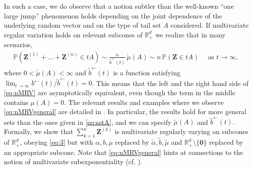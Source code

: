 \documentclass[aos]{imsart}
\numberwithin{equation}{section}
\theoremstyle{plain} %
\theoremstyle{remark}
\renewcommand\P{\mathbb{P}}
\newcommand{\R}{\mathbb{R}}
\def\bzero{\boldsymbol 0}
\def\bZ{\boldsymbol Z}
\begin{document}
{In such a case, we do observe that a notion subtler than the well-known ``one large jump'' phenomenon holds { depending on the joint dependence of the underlying random vector and on the type of tail set $A$ considered.} If multivariate regular variation  holds on relevant subcones of $\R_+^d$ we realize that in many scenarios,
\begin{align}\label{eq:nMRVgeneral}
\P(\bZ^{(1)} + \ldots + \bZ^{(n)} \in tA)\sim { \frac{n}{\widetilde b^{\leftarrow}(t)}\,\widetilde \mu(A)}   \sim n \,\P(\bZ\in tA)
\quad \text{ as } t\to\infty,
\end{align}
{where $0<\widetilde \mu(A)<\infty$ and $\widetilde b^{\leftarrow}(t)$ is a function satisfying $\lim_{t\to\infty}
 b^{\leftarrow}(t)/\widetilde b^{\leftarrow}(t)=0$.}
This means that the left and the right hand side of \eqref{eq:nMRV} %
are asymptotically equivalent, even though the term in the middle contains $\mu(A)=0$. %
The relevant results and examples where we observe \eqref{eq:nMRVgeneral} are detailed in . In particular, the results hold for more general sets than the ones  given in \eqref{eq:setA}, and  we can specify $\widetilde \mu(A)$ and $\widetilde b^{\leftarrow}(t)$. Formally, we show that $\sum_{k=1}^n\bZ^{(k)}$ is multivariate regularly varying on subcones of $\R_+^d$,
obeying \eqref{eq:3} but with $\alpha, b, \mu$ replaced by $\widetilde{\alpha}, \widetilde{b}, \widetilde{\mu}$ and $\R_+^d\setminus\{\bzero\}$  replaced by an appropriate subcone.
Note that \eqref{eq:nMRVgeneral} hints at connections to the notion of multivariate subexponentiality  (cf.  \cite{Cline:Resnick:1992,Omey:2006,samorodnitsky:sun:2016}).


}
\end{document}
